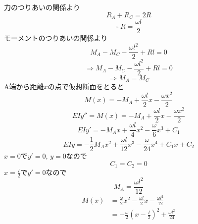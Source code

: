 \documentclass[dvipdfmx,a4paper]{jsarticle}
\begin{document}
力のつりあいの関係より
\begin{equation}
    R_A+R_C=2R
\end{equation}
\begin{equation}
    \therefore\ R=\frac{\omega l}{2}
\end{equation}
モーメントのつりあいの関係より
\begin{equation}
    M_A-M_C-\frac{\omega l^2}{2}+Rl=0    
\end{equation}
\begin{equation}
    \Rightarrow M_A-M_C-\frac{\omega l^2}{2}+Rl=0
\end{equation}
\begin{equation}
    \Rightarrow M_A=M_C
\end{equation}
A端から距離$x$の点で仮想断面をとると\\
\begin{equation}
    M(x)=-M_A+\frac{\omega l}{2}x-\frac{\omega x^2}{2}
\end{equation}
\begin{equation}
    EIy''=M(x)=-M_A+\frac{\omega l}{2}x-\frac{\omega x^2}{2}
\end{equation}
\begin{equation}
    EIy'=-M_Ax+\frac{\omega l}{4}x^2-\frac{\omega}{6}x^3+C_1
\end{equation}
\begin{equation}
    EIy=-\frac{1}{2}M_Ax^2+\frac{\omega l}{12}x^3-\frac{\omega}{24}x^4+C_1x+C_2
\end{equation}
$x=0$で$y'=0$, $y=0$なので
\begin{equation}
    C_1=C_2=0
\end{equation}
$x=\frac{l}{2}$で$y'=0$なので
\begin{equation}
    M_A=\frac{\omega l^2}{12}
\end{equation}
\begin{equation}
\begin{aligned}
    M(x)&=\frac{\omega}{2}x^2-\frac{\omega l}{2}x-\frac{\omega l^2}{12}\\
    &=-\frac{\omega}{2}(x-\frac{l}{2})^2+\frac{\omega l^2}{24}\\
\end{aligned}
\end{equation}

\vspace{1cm}
\end{document}
